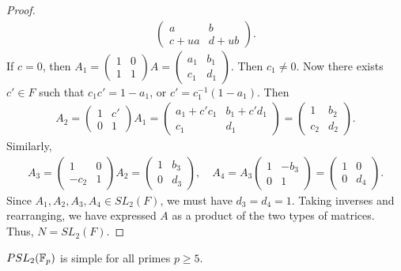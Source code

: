 \begin{proof}
\begin{align}
\begin{pmatrix}
            a & b \\ c + ua & d + ub
        \end{pmatrix}.
    \end{align}
    If $c = 0$, then $A_{1} = \begin{pmatrix}
        1 & 0 \\ 1 & 1
    \end{pmatrix} A = \begin{pmatrix}
        a_{1} & b_{1} \\ c_{1} & d_{1}
    \end{pmatrix}$. Then $c_{1} \neq 0$. Now there exists $c' \in F$ such that $c_{1} c' = 1-a_{1}$, or $c' = c_{1}^{-1}(1-a_{1})$. Then
    \begin{align}
        A_{2} = \begin{pmatrix}
            1 & c' \\ 0 & 1
        \end{pmatrix} A_{1} = \begin{pmatrix}
            a_{1} + c'c_{1} & b_{1} + c'd_{1} \\ c_{1} & d_{1}
        \end{pmatrix} = \begin{pmatrix}
            1 & b_{2} \\ c_{2} & d_{2}
        \end{pmatrix}.
    \end{align}
    Similarly,
    \begin{align}
        A_{3} = \begin{pmatrix}
            1 & 0 \\ -c_{2} & 1
        \end{pmatrix} A_{2} = \begin{pmatrix}
            1 & b_{3} \\ 0 & d_{3}
        \end{pmatrix}, \quad A_{4} = A_{3} \begin{pmatrix}
            1 & -b_{3} \\ 0 & 1
        \end{pmatrix} = \begin{pmatrix}
            1 & 0 \\ 0 & d_{4}
        \end{pmatrix}.
    \end{align}
    Since $A_{1},A_{2},A_{3},A_{4} \in SL_{2}(F)$, we must have $d_{3} = d_{4} = 1$. Taking inverses and rearranging, we have expressed $A$ as a product of the two types of matrices. Thus, $N = SL_{2}(F)$.
\end{proof}

\begin{corollary}
    $PSL_{2}(\mathbb{F}_{p})$ is simple for all primes $p \geq 5$.
\end{corollary}
